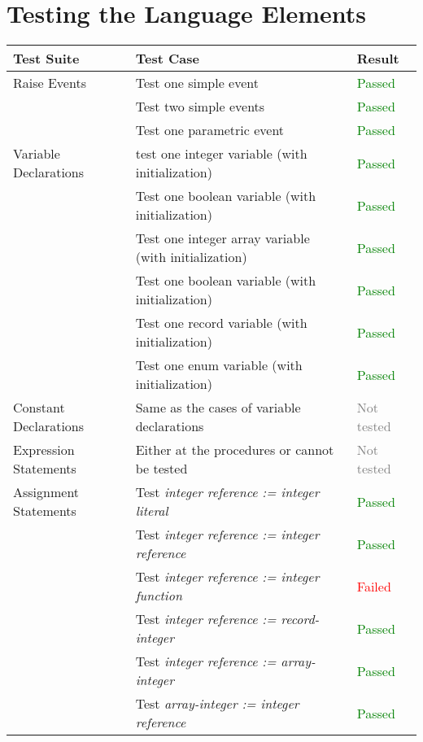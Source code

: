 \section{Testing the Language Elements}
\begin{table}[H]
	\footnotesize
	\centering
	\begin{tabular}{ l l l }
		\toprule
		Test Suite & Test Case & Result \\
		\midrule
		Raise Events & Test one simple event & \textcolor{green}{Passed}\\
		& Test two simple events & \textcolor{green}{Passed}\\
		& Test one parametric event & \textcolor{green}{Passed}\\
		Variable Declarations & test one integer variable (with initialization) & \textcolor{green}{Passed}\\
		& Test one boolean variable (with initialization) & \textcolor{green}{Passed}\\
		& Test one integer array variable (with initialization) & \textcolor{green}{Passed}\\
		& Test one boolean variable (with initialization) & \textcolor{green}{Passed}\\
		& Test one record variable (with initialization) & \textcolor{green}{Passed}\\
		& Test one enum variable (with initialization) & \textcolor{green}{Passed}\\
		Constant Declarations & Same as the cases of variable declarations & \textcolor{gray}{Not tested}\\
		Expression Statements & Either at the procedures or cannot be tested & \textcolor{gray}{Not tested}\\
		Assignment Statements & Test \textit{integer reference := integer literal} & \textcolor{green}{Passed}\\
		& Test \textit{integer reference := integer reference} & \textcolor{green}{Passed}\\
		& Test \textit{integer reference := integer function} & \textcolor{red}{Failed}\\
		& Test \textit{integer reference := record-integer} & \textcolor{green}{Passed}\\
		& Test \textit{integer reference := array-integer} & \textcolor{green}{Passed}\\
		& Test \textit{array-integer := integer reference} & \textcolor{green}{Passed}\\

\end{tabular}
\end{table}
